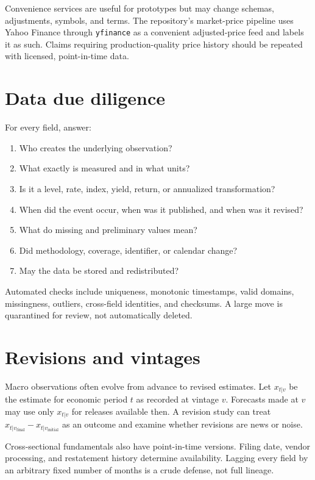 Convenience services are useful for prototypes but may change schemas, adjustments,
symbols, and terms. The repository's market-price pipeline uses Yahoo Finance through
\texttt{yfinance} as a convenient adjusted-price feed and labels it as such. Claims
requiring production-quality price history should be repeated with licensed,
point-in-time data.

\section{Data due diligence}

For every field, answer:

\begin{enumerate}
\item Who creates the underlying observation?
\item What exactly is measured and in what units?
\item Is it a level, rate, index, yield, return, or annualized transformation?
\item When did the event occur, when was it published, and when was it revised?
\item What do missing and preliminary values mean?
\item Did methodology, coverage, identifier, or calendar change?
\item May the data be stored and redistributed?
\end{enumerate}

Automated checks include uniqueness, monotonic timestamps, valid domains, missingness,
outliers, cross-field identities, and checksums. A large move is quarantined for
review, not automatically deleted.

\section{Revisions and vintages}

Macro observations often evolve from advance to revised estimates. Let
$x_{t|v}$ be the estimate for economic period $t$ as recorded at vintage $v$.
Forecasts made at $v$ may use only $x_{t|v}$ for releases available then. A
revision study can treat
$x_{t|v_{\mathrm{final}}}-x_{t|v_{\mathrm{initial}}}$ as an outcome and examine
whether revisions are news or noise.

Cross-sectional fundamentals also have point-in-time versions. Filing date, vendor
processing, and restatement history determine availability. Lagging every field by
an arbitrary fixed number of months is a crude defense, not full lineage.

